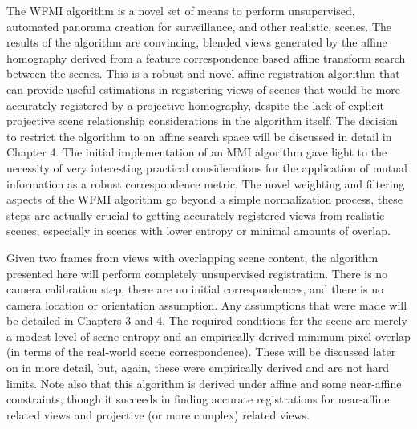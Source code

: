 %
%
%
%
%
%
%
%
%

%
%
%



The WFMI algorithm is a novel set of means to perform unsupervised, automated panorama creation for surveillance, and other realistic, scenes. The results of the algorithm are convincing, blended views generated by the affine homography derived from a feature correspondence based affine transform search between the scenes. This is a robust and novel affine registration algorithm that can provide useful estimations in registering views of scenes that would be more accurately registered by a projective homography, despite the lack of explicit projective scene relationship considerations in the algorithm itself. The decision to restrict the algorithm to an affine search space will be discussed in detail in Chapter 4. The initial implementation of an MMI algorithm gave light to the necessity of very interesting practical considerations for the application of mutual information as a robust correspondence metric. The novel weighting and filtering aspects of the WFMI algorithm go beyond a simple normalization process, these steps are actually crucial to getting accurately registered views from realistic scenes, especially in scenes with lower entropy or minimal amounts of overlap.

Given two frames from views with overlapping scene content, the algorithm presented here will perform completely unsupervised registration. There is no camera calibration step, there are no initial correspondences, and there is no camera location or orientation assumption. Any assumptions that were made will be detailed in Chapters 3 and 4. The required conditions for the scene are merely a modest level of scene entropy and an empirically derived minimum pixel overlap (in terms of the real-world scene correspondence). These will be discussed later on in more detail, but, again, these were empirically derived and are not hard limits. Note also that this algorithm is derived under affine and some near-affine constraints, though it succeeds in finding accurate registrations for near-affine related views and projective (or more complex) related views.


